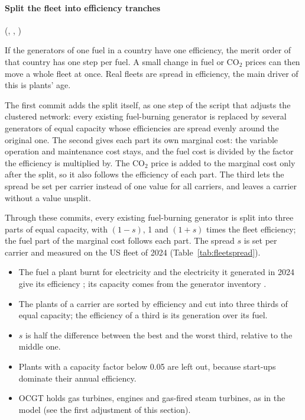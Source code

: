 \paragraph{Split the fleet into efficiency tranches} (, , )

If the generators of one fuel in a country have one efficiency, the merit order of that country has one step per fuel.
A small change in fuel or CO$_2$ prices can then move a whole fleet at once.
Real fleets are spread in efficiency, the main driver of this is plants' age.

The first commit adds the split itself, as one step of the script that adjusts the clustered network: every existing fuel-burning generator is replaced by several generators of equal capacity whose efficiencies are spread evenly around the original one.
The second gives each part its own marginal cost: the variable operation and maintenance cost stays, and the fuel cost is divided by the factor the efficiency is multiplied by.
The CO$_2$ price is added to the marginal cost only after the split, so it also follows the efficiency of each part.
The third lets the spread be set per carrier instead of one value for all carriers, and leaves a carrier without a value unsplit.

Through these commits, every existing fuel-burning generator is split into three parts of equal capacity, with $(1-s)$, 1 and $(1+s)$ times the fleet efficiency; the fuel part of the marginal cost follows each part.
The spread $s$ is set per carrier and measured on the US fleet of 2024 (Table~\ref{tab:fleetspread}).
\begin{itemize}[nosep,leftmargin=*]
  \item The fuel a plant burnt for electricity and the electricity it generated in 2024 give its efficiency \citep{eia923}; its capacity comes from the generator inventory \citep{eia860}.
  \item The plants of a carrier are sorted by efficiency and cut into three thirds of equal capacity; the efficiency of a third is its generation over its fuel.
  \item $s$ is half the difference between the best and the worst third, relative to the middle one.
  \item Plants with a capacity factor below 0.05 are left out, because start-ups dominate their annual efficiency.
  \item OCGT holds gas turbines, engines and gas-fired steam turbines, as in the model (see the first adjustment of this section).
\end{itemize}

